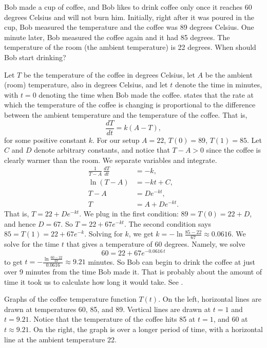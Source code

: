 \begin{example} \label{sep:coffeeexample}
Bob made a cup of coffee, and
Bob likes to drink coffee only once it reaches 60 degrees Celsius and will not burn him.
Initially, right after it was poured in the cup,
Bob measured the temperature and the coffee was 89 degrees Celsius.
One minute later, Bob measured the coffee again and it had 85 degrees.
The temperature of the room (the ambient temperature) is 22 degrees.
When should Bob start drinking?

Let $T$ be the temperature of the coffee in degrees Celsius, let $A$ be
the ambient (room) temperature, also in degrees Celsius,
and let $t$ denote the time in minutes, with $t=0$ denoting the time
when Bob made the coffee.
 states that the rate at which the
temperature of the coffee is changing
is proportional to the difference between the
ambient temperature and the temperature of the coffee.  That is,
\begin{equation*}
\frac{dT}{dt} = k(A-T) ,
\end{equation*}
for some positive constant $k$.
For our setup $A=22$, $T(0) = 89$, $T(1) = 85$.
Let $C$ and $D$ denote arbitrary
constants, and notice that $T - A > 0$ since the coffee is clearly warmer
than the room.
We separate variables and integrate. 
\begin{align*}
\frac{1}{T-A} \, \frac{dT}{dt} & = -k , \\
\ln (T-A) &= -kt + C , \\ %
T-A &= D e^{-kt} ,  \\
T &= A + D e^{-kt} .
\end{align*}
That is,
$T = 22 + D e^{-kt}$.  We plug in the first condition: $89 = T(0) = 22 +
D$,
and hence $D = 67$.  So
$T = 22 + 67 e^{-kt}$.  The second condition says $85 = T(1) = 
22 + 67 e^{-k}$.  Solving for $k$, we get
$k = - \ln \frac{85-22}{67} \approx 0.0616$.  We solve for the time $t$
that gives a temperature of 60 degrees.  Namely, we solve
\begin{equation*}
60 = 22 + 67 e^{-0.0616\,t}
\end{equation*}
to get
$t = - \frac{\ln \frac{60-22}{67}}{0.0616} \approx 9.21$ minutes.  So Bob can
begin to drink the coffee at just over 9 minutes from the time Bob made
it.  That is probably about the amount of time it took us to calculate how long
it would take.  See .
\begin{myfig}
\capstart
\caption{Graphs of the coffee temperature function $T(t)$.
On the left, horizontal
lines are drawn at temperatures 60, 85, and 89.  Vertical lines
are drawn at $t=1$ and $t=9.21$.  Notice that the
temperature of the coffee hits 85 at $t=1$, and 60 at
$t \approx 9.21$.  On the right, the graph is over a longer period of time,
with a horizontal line at the ambient temperature 22.\label{sintro:coffeefig}}
\end{myfig}
\end{example}

